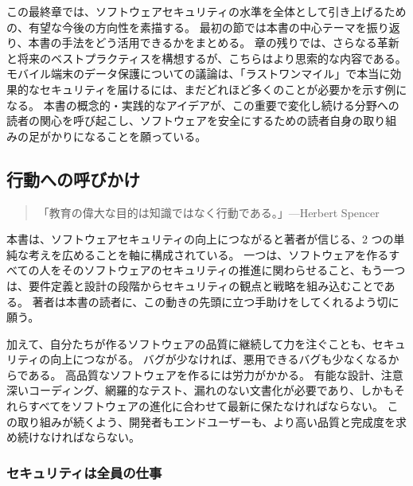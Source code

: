 \documentclass[uplatex]{jsarticle}
\begin{document}
この最終章では、ソフトウェアセキュリティの水準を全体として引き上げるための、有望な今後の方向性を素描する。
最初の節では本書の中心テーマを振り返り、本書の手法をどう活用できるかをまとめる。
章の残りでは、さらなる革新と将来のベストプラクティスを構想するが、こちらはより思索的な内容である。
モバイル端末のデータ保護についての議論は、「ラストワンマイル」で本当に効果的なセキュリティを届けるには、まだどれほど多くのことが必要かを示す例になる。
本書の概念的・実践的なアイデアが、この重要で変化し続ける分野への読者の関心を呼び起こし、ソフトウェアを安全にするための読者自身の取り組みの足がかりになることを願っている。

\subsection{行動への呼びかけ}

\begin{quote}
「教育の偉大な目的は知識ではなく行動である。」---Herbert Spencer
\end{quote}

本書は、ソフトウェアセキュリティの向上につながると著者が信じる、2 つの単純な考えを広めることを軸に構成されている。
一つは、ソフトウェアを作るすべての人をそのソフトウェアのセキュリティの推進に関わらせること、もう一つは、要件定義と設計の段階からセキュリティの観点と戦略を組み込むことである。
著者は本書の読者に、この動きの先頭に立つ手助けをしてくれるよう切に願う。

加えて、自分たちが作るソフトウェアの品質に継続して力を注ぐことも、セキュリティの向上につながる。
バグが少なければ、悪用できるバグも少なくなるからである。
高品質なソフトウェアを作るには労力がかかる。
有能な設計、注意深いコーディング、網羅的なテスト、漏れのない文書化が必要であり、しかもそれらすべてをソフトウェアの進化に合わせて最新に保たなければならない。
この取り組みが続くよう、開発者もエンドユーザーも、より高い品質と完成度を求め続けなければならない。

\subsubsection{セキュリティは全員の仕事}
\end{document}
